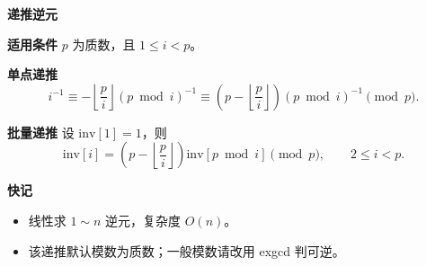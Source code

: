 \textbf{递推逆元}

\textbf{适用条件}
$p$ 为质数，且 $1\le i<p$。

\textbf{单点递推}
\[
i^{-1}\equiv
-\left\lfloor\frac{p}{i}\right\rfloor (p\bmod i)^{-1}
\equiv
\left(p-\left\lfloor\frac{p}{i}\right\rfloor\right)(p\bmod i)^{-1}
\pmod p.
\]

\textbf{批量递推}
设 $\mathrm{inv}[1]=1$，则
\[
\mathrm{inv}[i]=
\left(p-\left\lfloor\frac{p}{i}\right\rfloor\right)\mathrm{inv}[p\bmod i]
\pmod p,\qquad 2\le i<p.
\]

\textbf{快记}
\begin{itemize}
\item 线性求 $1\sim n$ 逆元，复杂度 $O(n)$。
\item 该递推默认模数为质数；一般模数请改用 exgcd 判可逆。
\end{itemize}
